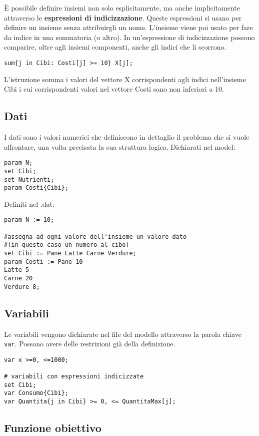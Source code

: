 È possibile definire insiemi non solo esplicitamente, ma anche implicitamente attraverso le \textbf{espressioni di indicizzazione}. Queste espressioni si usano per definire un insieme senza attribuirgli un nome. L'insieme viene poi usato per fare da indice in una sommatoria (o altro). In un'espressione di indicizzazione possono comparire, oltre agli insiemi componenti, anche gli indici che li scorrono.
\begin{verbatim}
sum{j in Cibi: Costi[j] >= 10} X[j];
\end{verbatim}
L'istruzione somma i valori del vettore X corrispondenti agli indici nell'insieme Cibi i cui corrispondenti valori nel vettore Costi sono non inferiori a 10.

\subsection{Dati}
I dati sono i valori numerici che definiscono in dettaglio il problema che si vuole affrontare, una volta precisata la sua struttura logica. 
Dichiarati nel model:
\begin{verbatim}
param N;
set Cibi;
set Nutrienti;
param Costi{Cibi};
\end{verbatim}
Definiti nel .dat:
\begin{verbatim}
param N := 10;

#assegna ad ogni valore dell'insieme un valore dato
#(in questo caso un numero al cibo)
set Cibi := Pane Latte Carne Verdure;
param Costi := Pane 10
Latte 5
Carne 20
Verdure 8;
\end{verbatim}

\subsection{Variabili}

Le variabili vengono dichiarate nel file del modello attraverso la parola chiave \texttt{var}. Possono avere delle restrizioni già della definizione.
\begin{verbatim}
var x >=0, <=1000; 

# variabili con espressioni indicizzate
set Cibi;
var Consumo{Cibi};
var Quantita{j in Cibi} >= 0, <= QuantitaMax[j];
\end{verbatim}

\subsection{Funzione obiettivo}


